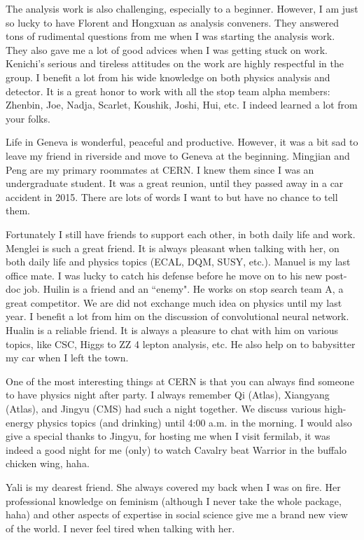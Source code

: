\documentclass[oneside,final,letterpaper]{ucr}
\begin{document}
\begin{frontmatter}
\begin{acknowledgements}
The analysis work is also challenging, especially to a beginner. However, I am just so lucky to have Florent and Hongxuan as analysis conveners. They answered tons of rudimental questions from me when I was starting the analysis work. They also gave me a lot of good advices when I was getting stuck on work. Kenichi's serious and tireless attitudes on the work are highly respectful in the group. I benefit a lot from his wide knowledge on both physics analysis and detector. It is a great honor to work with all the stop team alpha members: Zhenbin, Joe, Nadja, Scarlet, Koushik, Joshi, Hui, etc. I indeed learned a lot from your folks. 

Life in Geneva is wonderful, peaceful and productive. However, it was a bit sad to leave my friend in riverside and move to Geneva at the beginning. Mingjian and Peng are my primary roommates at CERN. I knew them since I was an undergraduate student. It was a great reunion, until they passed away in a car accident in 2015. There are lots of words I want to but have no chance to tell them. 

Fortunately I still have friends to support each other, in both daily life and work. Menglei is such a great friend. It is always pleasant when talking with her, on both daily life and physics topics (ECAL, DQM, SUSY, etc.). Manuel is my last office mate. I was lucky to catch his defense before he move on to his new post-doc job. Huilin is a friend and an ``enemy". He works on stop search team A, a great competitor. We are did not exchange much idea on physics until my last year. I benefit a lot from him on the discussion of convolutional neural network. Hualin is a reliable friend. It is always a pleasure to chat with him on various topics, like CSC, Higgs to ZZ 4 lepton analysis, etc. He also help on to babysitter my car when I left the town. 

One of the most interesting things at CERN is that you can always find someone to have physics night after party. I always remember Qi (Atlas), Xiangyang (Atlas), and Jingyu (CMS) had such a night together. We discuss various high-energy physics topics (and drinking) until 4:00 a.m. in the morning. I would also give a special thanks to Jingyu, for hosting me when I visit fermilab, it was indeed a good night for me (only) to watch Cavalry beat Warrior in the buffalo chicken wing, haha. 

Yali is my dearest friend. She always covered my back when I was on fire. Her professional knowledge on feminism (although I never take the whole package, haha) and other aspects of expertise in social science give me a brand new view of the world. I never feel tired when talking with her. 


\end{acknowledgements}
\end{frontmatter}
\end{document}
